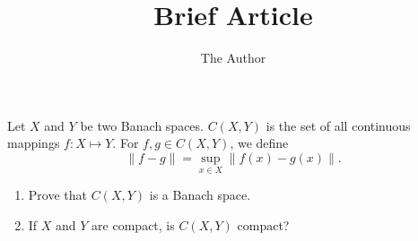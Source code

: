 \documentclass[11pt]{amsart}
\title{Brief Article}
\author{The Author}
\begin{document}
Let $X$ and $Y$ be two Banach spaces.
$C(X, Y)$ is the set of all continuous mappings $f: X\mapsto Y$.
For $f, g\in C(X, Y)$, we define
$$\|f - g\|= \sup_{x\in X} \|f(x) - g(x)\|.$$
\begin{enumerate}
\item
Prove that $C(X, Y)$ is a Banach space.
\item If $X$ and $Y$ are compact, is $C(X, Y)$ compact?
\end{enumerate}
\end{document}
